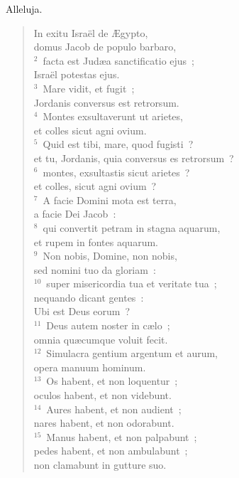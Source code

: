 \bchapter
\lettrine[lines=3,image=true,loversize=0.05,lraise=-0.03]{A}{}lleluja. \begin{flushleft}\begin{verse}\vspace{6pt}In exitu Isra\"el de \AE gypto,\\ domus Jacob de populo barbaro,\\
${}^{2}$~facta est Jud\ae a sanctificatio ejus~;\\ Isra\"el potestas ejus.\\
${}^{3}$~Mare vidit, et fugit~;\\ Jordanis conversus est retrorsum.\\
${}^{4}$~Montes exsultaverunt ut arietes,\\ et colles sicut agni ovium.\\
${}^{5}$~Quid est tibi, mare, quod fugisti~?\\ et tu, Jordanis, quia conversus es retrorsum~?\\
${}^{6}$~montes, exsultastis sicut arietes~?\\ et colles, sicut agni ovium~?\\
${}^{7}$~A facie Domini mota est terra,\\ a facie Dei Jacob~:\\
${}^{8}$~qui convertit petram in stagna aquarum,\\ et rupem in fontes aquarum.\\
${}^{9}$~Non nobis, Domine, non nobis,\\ sed nomini tuo da gloriam~:\\
${}^{10}$~super misericordia tua et veritate tua~;\\ nequando dicant gentes~:\\ Ubi est Deus eorum~?\\
${}^{11}$~Deus autem noster in c\ae lo~;\\ omnia qu\ae cumque voluit fecit.\\
${}^{12}$~Simulacra gentium argentum et aurum,\\ opera manuum hominum.\\
${}^{13}$~Os habent, et non loquentur~;\\ oculos habent, et non videbunt.\\
${}^{14}$~Aures habent, et non audient~;\\ nares habent, et non odorabunt.\\
${}^{15}$~Manus habent, et non palpabunt~;\\ pedes habent, et non ambulabunt~;\\ non clamabunt in gutture suo.\\

\end{verse}
\end{flushleft}
